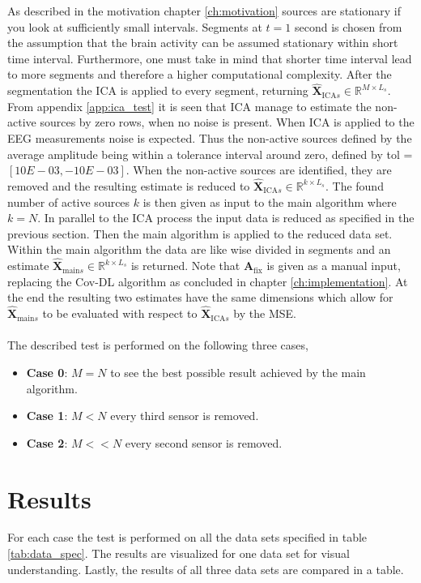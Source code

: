 As described in the motivation chapter \ref{ch:motivation} sources are stationary if you look at sufficiently small intervals. 
Segments at $t = 1$ second is chosen from the assumption that the brain activity can be assumed stationary within short time interval.
Furthermore, one must take in mind that shorter time interval lead to more segments and therefore a higher computational complexity. 
After the segmentation the ICA is applied to every segment, returning $\hat{\mathbf{X}}_{\text{ICA} s} \in \mathbb{R}^{M \times L_s}$.
From appendix \ref{app:ica_test} it is seen that ICA manage to estimate the non-active sources by zero rows, when no noise is present. 
When ICA is applied to the EEG measurements noise is expected. 
Thus the non-active sources defined by the average amplitude being within a tolerance interval around zero, defined by tol = $[10E-03, -10E-03]$. 
When the non-active sources are identified, they are removed and the resulting estimate is reduced to $\hat{\mathbf{X}}_{\text{ICA} s} \in \mathbb{R}^{k \times L_s}$. 
The found number of active sources $k$ is then given as input to the main algorithm where $k = N$. 
In parallel to the ICA process the input data is reduced as specified in the previous section. 
Then the main algorithm is applied to the reduced data set. 
Within the main algorithm the data are like wise divided in segments and an estimate $\hat{\mathbf{X}}_{\text{main} s} \in \mathbb{R}^{k \times L_s}$ is returned. 
Note that $\mathbf{A}_{\text{fix}}$ is given as a manual input, replacing the Cov-DL algorithm as concluded in chapter \ref{ch:implementation}.
At the end the resulting two estimates have the same dimensions which allow for $\hat{\mathbf{X}}_{\text{main} s}$ to be evaluated with respect to $\hat{\mathbf{X}}_{\text{ICA} s}$ by the MSE. 
\\ \\
The described test is performed on the following three cases,
\begin{itemize}
\item \textbf{Case 0}: $M = N$ to see the best possible result achieved by the main algorithm. 
\item \textbf{Case 1}: $M < N$ every third sensor is removed. 
\item \textbf{Case 2}: $M << N$ every second sensor is removed.
\end{itemize}

\section{Results}
For each case the test is performed on all the data sets specified in table \ref{tab:data_spec}.
The results are visualized for one data set for visual understanding.
Lastly, the results of all three data sets are compared in a table.  

